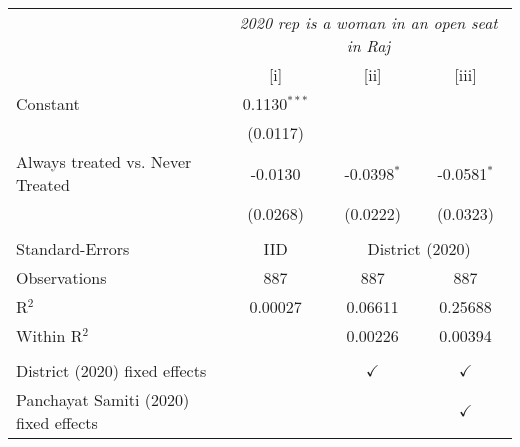 
\begingroup
\centering
\begin{tabular}{lccc}
   \toprule
    & \multicolumn{3}{c}{\textit{2020 rep is a woman in an open seat in Raj}}\\
                                         & [i]            & [ii]          & [iii]\\  
   \midrule 
   Constant                              & 0.1130$^{***}$ &               &   \\   
                                         & (0.0117)       &               &   \\   
   Always treated vs. Never Treated      & -0.0130        & -0.0398$^{*}$ & -0.0581$^{*}$\\   
                                         & (0.0268)       & (0.0222)      & (0.0323)\\   
    \\
   Standard-Errors & IID & \multicolumn{2}{c}{District (2020)} \\ 
   Observations                          & 887            & 887           & 887\\  
   R$^2$                                 & 0.00027        & 0.06611       & 0.25688\\  
   Within R$^2$                          &                & 0.00226       & 0.00394\\  
    \\
   District (2020) fixed effects         &                & $\checkmark$  & $\checkmark$\\   
   Panchayat Samiti (2020) fixed effects &                &               & $\checkmark$\\   
   \bottomrule
\end{tabular}
\par\endgroup


